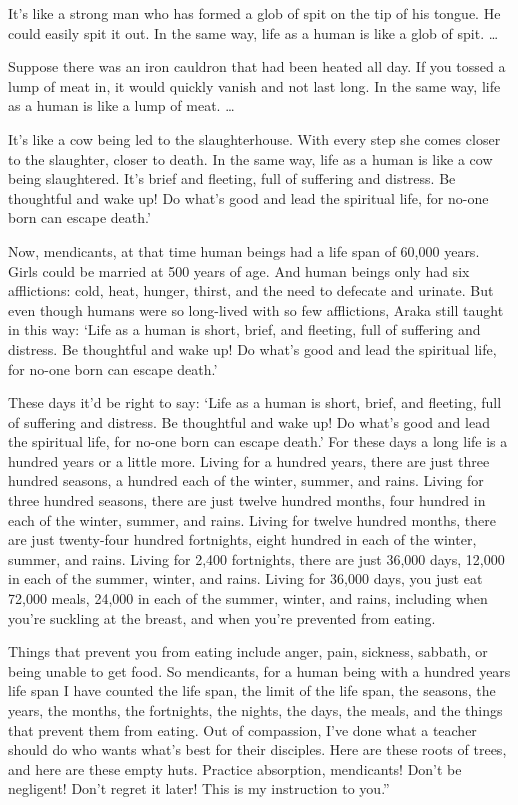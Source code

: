 \documentclass[12pt,openany]{book}%
\begin{document}
It’s like a strong man who has formed a glob of spit on the tip of his tongue. He could easily spit it out. In the same way, life as a human is like a glob of spit. … 

Suppose there was an iron cauldron that had been heated all day. If you tossed a lump of meat in, it would quickly vanish and not last long. In the same way, life as a human is like a lump of meat. … 

It’s like a cow being led to the slaughterhouse. With every step she comes closer to the slaughter, closer to death. In the same way, life as a human is like a cow being slaughtered. It’s brief and fleeting, full of suffering and distress. Be thoughtful and wake up! Do what’s good and lead the spiritual life, for no-one born can escape death.’ 

Now, mendicants, at that time human beings had a life span of 60,000 years. Girls could be married at 500 years of age. And human beings only had six afflictions: cold, heat, hunger, thirst, and the need to defecate and urinate. But even though humans were so long-lived with so few afflictions, Araka still taught in this way: ‘Life as a human is short, brief, and fleeting, full of suffering and distress. Be thoughtful and wake up! Do what’s good and lead the spiritual life, for no-one born can escape death.’ 

These days it’d be right to say: ‘Life as a human is short, brief, and fleeting, full of suffering and distress. Be thoughtful and wake up! Do what’s good and lead the spiritual life, for no-one born can escape death.’ For these days a long life is a hundred years or a little more. Living for a hundred years, there are just three hundred seasons, a hundred each of the winter, summer, and rains. Living for three hundred seasons, there are just twelve hundred months, four hundred in each of the winter, summer, and rains. Living for twelve hundred months, there are just twenty-four hundred fortnights, eight hundred in each of the winter, summer, and rains. Living for 2,400 fortnights, there are just 36,000 days, 12,000 in each of the summer, winter, and rains. Living for 36,000 days, you just eat 72,000 meals, 24,000 in each of the summer, winter, and rains, including when you’re suckling at the breast, and when you’re prevented from eating. 

Things that prevent you from eating include anger, pain, sickness, sabbath, or being unable to get food. So mendicants, for a human being with a hundred years life span I have counted the life span, the limit of the life span, the seasons, the years, the months, the fortnights, the nights, the days, the meals, and the things that prevent them from eating. Out of compassion, I’ve done what a teacher should do who wants what’s best for their disciples. Here are these roots of trees, and here are these empty huts. Practice absorption, mendicants! Don’t be negligent! Don’t regret it later! This is my instruction to you.” 
\end{document}
